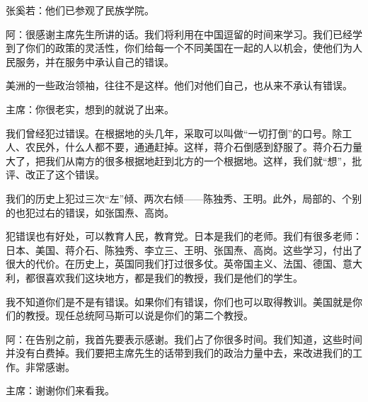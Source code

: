 张奚若：他们已参观了民族学院。

阿：很感谢主席先生所讲的话。我们将利用在中国逗留的时间来学习。我们已经学到了你们的政策的灵活性，你们给每一个不同美国在一起的人以机会，使他们为人民服务，并在服务中承认自己的错误。

美洲的一些政治领袖，往往不是这样。他们对他们自己，也从来不承认有错误。

主席：你很老实，想到的就说了出来。

我们曾经犯过错误。在根据地的头几年，采取可以叫做“一切打倒”的口号。除工人、农民外，什么人都不要，通通赶掉。这样，蒋介石倒感到舒服了。蒋介石力量大了，把我们从南方的很多根据地赶到北方的一个根据地。这样，我们就“想”，批评、改正了这个错误。

我们的历史上犯过三次“左”倾、两次右倾——陈独秀、王明。此外，局部的、个别的也犯过右的错误，如张国焘、高岗。

犯错误也有好处，可以教育人民，教育党。日本是我们的老师。我们有很多老师：日本、美国、蒋介石、陈独秀、李立三、王明、张国焘、高岗。这些学习，付出了很大的代价。在历史上，英国同我们打过很多仗。英帝国主义、法国、德国、意大利，都很喜欢我们这块地方，都是我们的教授，我们是他们的学生。

我不知道你们是不是有错误。如果你们有错误，你们也可以取得教训。美国就是你们的教授。现任总统阿马斯可以说是你们的第二个教授。

阿：在告别之前，我首先要表示感谢。我们占了你很多时间。我们知道，这些时间并没有白费掉。我们要把主席先生的话带到我们的政治力量中去，来改进我们的工作。非常感谢。

主席：谢谢你们来看我。



